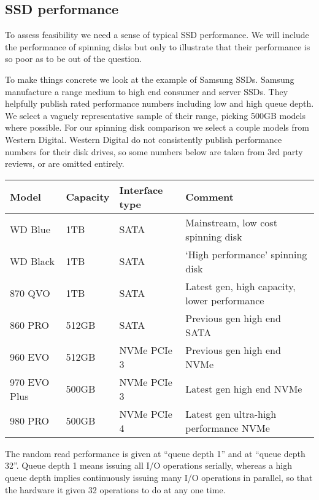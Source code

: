 \documentclass[11pt,a4paper]{article}
\begin{document}
\subsection{SSD performance}
\label{ssd-performance}

To assess feasibility we need a sense of typical SSD performance. We will
include the performance of spinning disks but only to illustrate that their
performance is so poor as to be out of the question.

To make things concrete we look at the example of Samsung SSDs. Samsung
manufacture a range medium to high end consumer and server SSDs. They helpfully
publish rated performance numbers including low and high queue depth. We select
a vaguely representative sample of their range, picking 500GB models where
possible. For our spinning disk comparison we select a couple models from
Western Digital. Western Digital do not consistently publish performance numbers
for their disk drives, so some numbers below are taken from 3rd party reviews,
or are omitted entirely.
\begin{center}
\begin{tabular}[]{llll}
  Model & Capacity & Interface type & Comment \\
  \toprule
  WD Blue      & 1TB   & SATA        & Mainstream, low cost spinning disk \\
  WD Black     & 1TB   & SATA        & `High performance' spinning disk  \\
  \midrule
  870 QVO      & 1TB   & SATA        & Latest gen, high capacity, lower performance \\
  860 PRO      & 512GB & SATA        & Previous gen high end SATA \\
  960 EVO      & 512GB & NVMe PCIe 3 & Previous gen high end NVMe \\
  970 EVO Plus & 500GB & NVMe PCIe 3 & Latest gen high end NVMe \\
  980 PRO      & 500GB & NVMe PCIe 4 & Latest gen ultra-high performance NVMe
\end{tabular}
\end{center}
The random read performance is given at ``queue depth 1'' and at ``queue depth
32''. Queue depth 1 means issuing all I/O operations serially, whereas a high
queue depth implies continuously issuing many I/O operations in parallel, so
that the hardware it given 32 operations to do at any one time.
\end{document}
